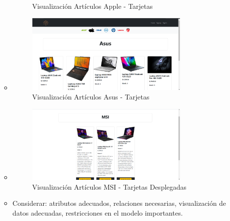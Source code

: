 \documentclass{article}
\begin{document}
\begin{itemize}
\begin{itemize}
\begin{figure}[H]
		      \caption{Visualización Artículos Apple - Tarjetas}
	   \end{figure}
    \item   \begin{figure}[H]
		      \centering
                \includegraphics[width=0.8\textwidth,keepaspectratio]{img/asus.png}
		      \caption{Visualización Artículos Asus - Tarjetas}
	   \end{figure}
    \item   \begin{figure}[H]
		      \centering
                \includegraphics[width=0.8\textwidth,keepaspectratio]{img/msi.png}
		      \caption{Visualización Artículos MSI - Tarjetas Desplegadas}
	   \end{figure}
            \item Considerar: atributos adecuados, relaciones necesarias, visualización de datos adecuadas,
            restricciones en el modelo importantes.
        \end{itemize}
    \end{itemize}
\end{document}
